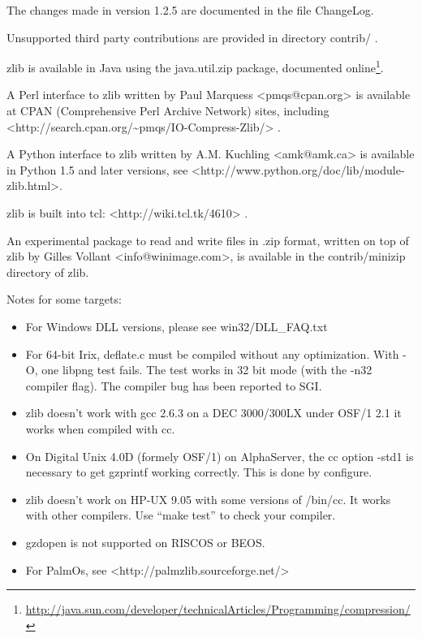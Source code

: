 The changes made in version 1.2.5 are documented in the file ChangeLog.

Unsupported third party contributions are provided in directory contrib/ .

zlib is available in Java using the java.util.zip package, documented online\footnote{\url{http://java.sun.com/developer/technicalArticles/Programming/compression/}}.

A Perl interface to zlib written by Paul Marquess \textless{}pmqs@cpan.org\textgreater{} is available at CPAN (Comprehensive Perl Archive Network) sites, including \textless{}http://search.cpan.org/\textasciitilde{}pmqs/IO-Compress-Zlib/\textgreater{} .

A Python interface to zlib written by A.M. Kuchling \textless{}amk@amk.ca\textgreater{} is available in Python 1.5 and later versions, see \textless{}http://www.python.org/doc/lib/module-zlib.html\textgreater{}.

zlib is built into tcl: \textless{}http://wiki.tcl.tk/4610\textgreater{} .

An experimental package to read and write files in .zip format, written on top of zlib by Gilles Vollant \textless{}info@winimage.com\textgreater{}, is available in the contrib/minizip directory of zlib.

Notes for some targets:

\begin{itemize}
\item
  For Windows DLL versions, please see win32/DLL\_FAQ.txt
\item
  For 64-bit Irix, deflate.c must be compiled without any optimization. With -O, one libpng test fails. The test works in 32 bit mode (with the -n32~~ compiler flag). The compiler bug has been reported to SGI.
\item
  zlib doesn't work with gcc 2.6.3 on a DEC 3000/300LX under OSF/1 2.1 it works when compiled with cc.
\item
  On Digital Unix 4.0D (formely OSF/1) on AlphaServer, the cc option -std1 is necessary to get gzprintf working correctly. This is done by configure.
\item
  zlib doesn't work on HP-UX 9.05 with some versions of /bin/cc. It works with other compilers. Use ``make test'' to check your compiler.
\item
  gzdopen is not supported on RISCOS or BEOS.
\item
  For PalmOs, see \textless{}http://palmzlib.sourceforge.net/\textgreater{}
\end{itemize}


